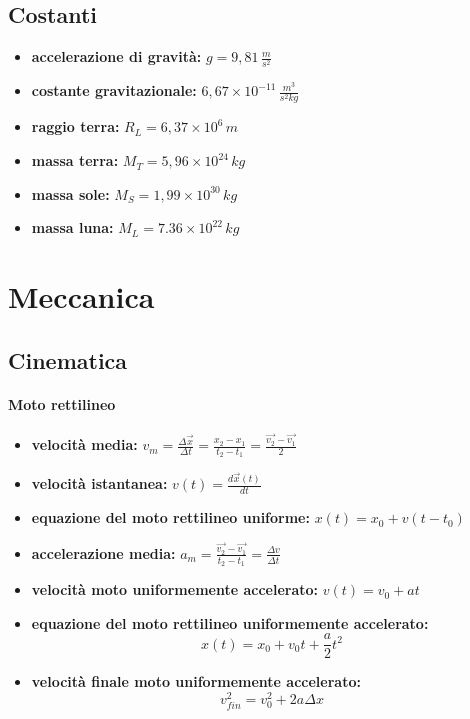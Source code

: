 \documentclass[a4paper,12pt, oneside]{book}
\begin{document}
\section{Costanti}
\begin{itemize}
\item \textbf{accelerazione di gravità:} $g=9,81\, \frac{m}{s^2}$
\item \textbf{costante gravitazionale:} $6,67 \times 10^{-11}\, \frac{m^3}{s^2kg}$
\item \textbf{raggio terra:} $R_L=6,37\times 10^{6}\, m$
\item \textbf{massa terra:} $M_T=5,96\times 10^{24}\, kg$
\item \textbf{massa sole:} $M_S =1,99\times 10^{30}\, kg$
\item \textbf{massa luna:} $M_L=7.36\times 10^{22}\, kg$
\end{itemize}
\chapter{Meccanica}
\section{Cinematica}
\subsubsection{Moto rettilineo}
\begin{itemize}
\item \textbf{velocità media: }$v_m=\frac{\Delta \vec{x}}{\Delta t}=\frac{x_2-x_1}{t_2-t_1}=\frac{\vec{v_2}-\vec{v_1}}{2}$
\item  \textbf{velocità istantanea: }$v(t)=\frac{d\vec{x}(t)}{dt}$
\item \textbf{equazione del moto rettilineo uniforme: }$x(t)=x_0+v(t-t_0)$
\item \textbf{accelerazione media:} $a_m=\frac{\vec{v_2}-\vec{v_1}}{t_2-t_1}=\frac{\Delta v}{\Delta t}$
\item \textbf{velocità moto uniformemente accelerato:} $v(t)=v_0+at$
\item \textbf{equazione del moto rettilineo uniformemente accelerato:} $$x(t)=x_0+v_0t+\frac{a}{2}t^2$$
\item \textbf{velocità finale moto uniformemente accelerato:}
$$v_{fin}^2=v_0^2+2a\Delta x$$
\end{itemize}
\newpage
\end{document}
